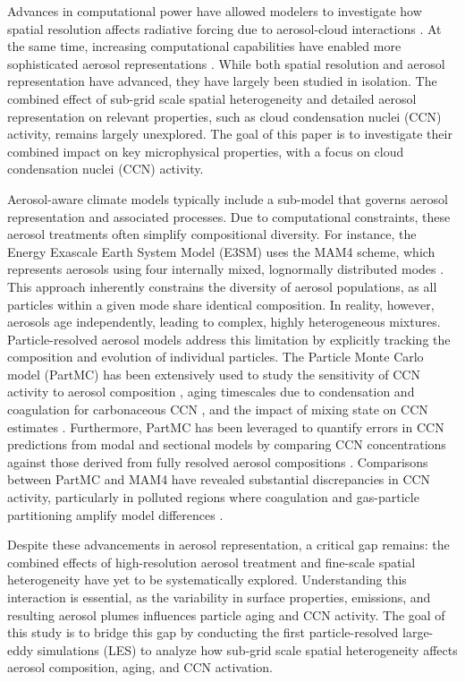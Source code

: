 \documentclass[acp, manuscript]{copernicus}
\begin{document}
Advances in computational power have allowed modelers to investigate
how spatial resolution affects radiative forcing due to aerosol-cloud
interactions \citep{ma_how_2015}. At the same time, increasing
computational capabilities have enabled more sophisticated aerosol
representations \citep{zaveri_development_2021,
  tilmes_description_2023}. While both spatial resolution and aerosol
representation have advanced, they have largely been studied in
isolation. The combined effect of sub-grid scale spatial heterogeneity
and detailed aerosol representation on relevant properties, such as
cloud condensation nuclei (CCN) activity, remains largely unexplored.
The goal of this paper is to investigate their combined impact on key 
microphysical properties, with a focus on cloud condensation nuclei 
(CCN) activity.

Aerosol-aware climate models typically include a sub-model that
governs aerosol representation and associated processes. Due to
computational constraints, these aerosol treatments often simplify
compositional diversity. For instance, the Energy Exascale Earth
System Model (E3SM) uses the MAM4 scheme, which represents aerosols
using four internally mixed, lognormally distributed modes
\citep{golaz_doe_2022}. This approach inherently constrains the
diversity of aerosol populations, as all particles within a given mode
share identical composition. In reality, however, aerosols age
independently, leading to complex, highly heterogeneous
mixtures. Particle-resolved aerosol models address this limitation by
explicitly tracking the composition and evolution of individual
particles. The Particle Monte Carlo model (PartMC) \citep{riemer_simulating_2009} 
has been extensively used to study the sensitivity of
CCN activity to aerosol composition \citep{fierce_when_2013}, aging
timescales due to condensation and coagulation for carbonaceous CCN
\citep{fierce_explaining_2015}, and the impact of mixing state on CCN
estimates \citep{ching_metrics_2017}. Furthermore, PartMC has been
leveraged to quantify errors in CCN predictions from modal and
sectional models by comparing CCN concentrations against those derived
from fully resolved aerosol compositions
\citep{zaveri_particle-resolved_2010, ching_metrics_2017}. Comparisons
between PartMC and MAM4 have revealed substantial discrepancies in CCN
activity, particularly in polluted regions where coagulation and
gas-particle partitioning amplify model differences
\citep{fierce_quantifying_2024}.

Despite these advancements in aerosol representation, a critical gap
remains: the combined effects of high-resolution aerosol treatment and
fine-scale spatial heterogeneity have yet to be systematically
explored. Understanding this interaction is essential, as the
variability in surface properties, emissions, and resulting aerosol
plumes influences particle aging and CCN activity. The goal of this
study is to bridge this gap by conducting the first particle-resolved
large-eddy simulations (LES) to analyze how sub-grid scale spatial
heterogeneity affects aerosol composition, aging, and CCN activation.
\end{document}
